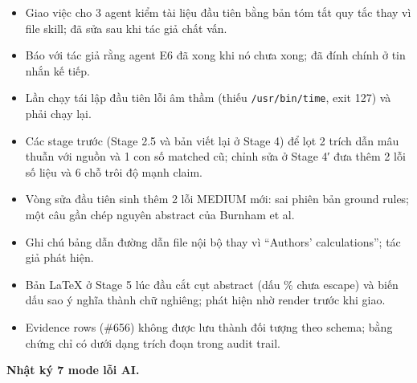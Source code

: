 \documentclass[12pt,a4paper]{article}
\providecommand{\tightlist}{\setlength{\itemsep}{0pt}\setlength{\parskip}{0pt}}
\begin{document}
\begin{itemize}
\tightlist
\item
  Giao việc cho 3 agent kiểm tài liệu đầu tiên bằng bản tóm tắt quy tắc
  thay vì file skill; đã sửa sau khi tác giả chất vấn.
\item
  Báo với tác giả rằng agent E6 đã xong khi nó chưa xong; đã đính chính
  ở tin nhắn kế tiếp.
\item
  Lần chạy tái lập đầu tiên lỗi âm thầm (thiếu \texttt{/usr/bin/time},
  exit 127) và phải chạy lại.
\item
  Các stage trước (Stage 2.5 và bản viết lại ở Stage 4) để lọt 2 trích
  dẫn mâu thuẫn với nguồn và 1 con số matched cũ; chỉnh sửa ở Stage 4′
  đưa thêm 2 lỗi số liệu và 6 chỗ trôi độ mạnh claim.
\item
  Vòng sửa đầu tiên sinh thêm 2 lỗi MEDIUM mới: sai phiên bản ground
  rules; một câu gần chép nguyên abstract của Burnham et al.
\item
  Ghi chú bảng dẫn đường dẫn file nội bộ thay vì ``Authors'
  calculations''; tác giả phát hiện.
\item
  Bản LaTeX ở Stage 5 lúc đầu cắt cụt abstract (dấu \% chưa escape) và
  biến dấu sao ý nghĩa thành chữ nghiêng; phát hiện nhờ render trước khi
  giao.
\item
  Evidence rows (\#656) không được lưu thành đối tượng theo schema; bằng
  chứng chỉ có dưới dạng trích đoạn trong audit trail.
\end{itemize}

\textbf{Nhật ký 7 mode lỗi AI.}
\end{document}
